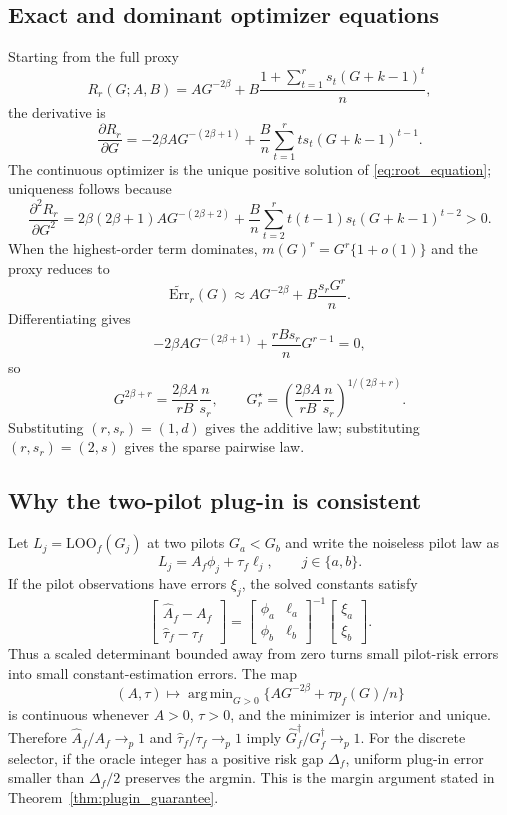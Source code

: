 \documentclass{article}
\DeclareMathOperator*{\argmin}{arg\,min}
\newcommand{\Err}{\mathrm{Err}}
\newcommand{\LoO}{\mathrm{LOO}}
\begin{document}
\subsection{Exact and dominant optimizer equations}

Starting from the full proxy
\[
R_r(G;A,B)=A G^{-2\beta}+B\frac{1+\sum_{t=1}^r s_t(G+k-1)^t}{n},
\]
the derivative is
\[
\frac{\partial R_r}{\partial G}
=-2\beta A G^{-(2\beta+1)}+\frac{B}{n}\sum_{t=1}^r t s_t(G+k-1)^{t-1}.
\]
The continuous optimizer is the unique positive solution of \eqref{eq:root_equation}; uniqueness follows because
\[
\frac{\partial^2 R_r}{\partial G^2}
=2\beta(2\beta+1)A G^{-(2\beta+2)}+\frac{B}{n}\sum_{t=2}^r t(t-1)s_t(G+k-1)^{t-2}>0.
\]
When the highest-order term dominates, $m(G)^r=G^r\{1+o(1)\}$ and the proxy reduces to
\[
\widetilde{\Err}_r(G)\approx A G^{-2\beta}+B\frac{s_rG^r}{n}.
\]
Differentiating gives
\[
-2\beta A G^{-(2\beta+1)}+\frac{rB s_r}{n}G^{r-1}=0,
\]
so
\[
G^{2\beta+r}=\frac{2\beta A}{rB}\frac{n}{s_r},
\qquad
G_r^\star=\left(\frac{2\beta A}{rB}\frac{n}{s_r}\right)^{1/(2\beta+r)}.
\]
Substituting $(r,s_r)=(1,d)$ gives the additive law; substituting $(r,s_r)=(2,s)$ gives the sparse pairwise law.

\subsection{Why the two-pilot plug-in is consistent}

Let $L_j=\LoO_f(G_j)$ at two pilots $G_a<G_b$ and write the noiseless pilot law as
\[
L_j=A_f\phi_j+\tau_f\ell_j,\qquad j\in\{a,b\}.
\]
If the pilot observations have errors $\xi_j$, the solved constants satisfy
\[
\begin{bmatrix}
\widehat A_f-A_f\\[2pt]
\widehat\tau_f-\tau_f
\end{bmatrix}
=
\begin{bmatrix}
\phi_a & \ell_a\\[2pt]
\phi_b & \ell_b
\end{bmatrix}^{-1}
\begin{bmatrix}
\xi_a\\[2pt]
\xi_b
\end{bmatrix}.
\]
Thus a scaled determinant bounded away from zero turns small pilot-risk errors into small constant-estimation errors. The map
\[
(A,\tau)\mapsto \argmin_{G>0}\{A G^{-2\beta}+\tau p_f(G)/n\}
\]
is continuous whenever $A>0$, $\tau>0$, and the minimizer is interior and unique. Therefore $\widehat A_f/A_f\to_p1$ and $\widehat\tau_f/\tau_f\to_p1$ imply $\widehat G_f^\dagger/G_f^\dagger\to_p1$. For the discrete selector, if the oracle integer has a positive risk gap $\Delta_f$, uniform plug-in error smaller than $\Delta_f/2$ preserves the argmin. This is the margin argument stated in Theorem~\ref{thm:plugin_guarantee}.
\end{document}
